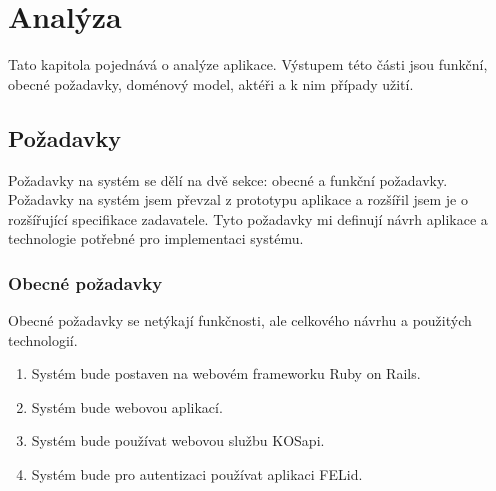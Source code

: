 \chapter{Analýza}
Tato kapitola pojednává o analýze aplikace. Výstupem této části jsou funkční, obecné požadavky, doménový model, aktéři a k nim případy užití.

\section{Požadavky}
Požadavky na systém se dělí na dvě sekce: obecné a funkční požadavky. Požadavky na systém jsem převzal z prototypu aplikace \citep{prototyp_documentace} a rozšířil jsem je o rozšířující specifikace zadavatele. Tyto požadavky mi definují návrh aplikace a technologie potřebné pro implementaci systému.

\subsection{Obecné požadavky}
Obecné požadavky se netýkají funkčnosti, ale celkového návrhu a použitých technologií.
\begin{enumerate}
\item Systém bude postaven na webovém frameworku Ruby on Rails.
\item Systém bude webovou aplikací.
\item Systém bude používat webovou službu KOSapi.
\item Systém bude pro autentizaci používat aplikaci FELid.
\end{enumerate}

